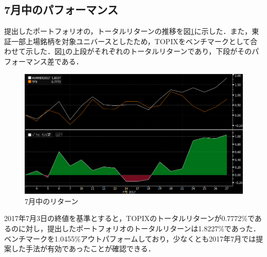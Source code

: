 ﻿\documentclass[a4paper]{jarticle}
\begin{document}
\subsection{7月中のパフォーマンス}

提出したポートフォリオの，トータルリターンの推移を図\ref{fig:totalreturn}に示した．また，東証一部上場銘柄を対象ユニバースとしたため，TOPIXをベンチマークとして合わせて示した．図\ref{fig:totalreturn}の上段がそれぞれのトータルリターンであり，下段がそのパフォーマンス差である．

\begin{figure}[htbp]
	\begin{center}
		\includegraphics[width=15cm]{./fig/totalreturn.png}
		\caption{7月中のリターン}
		\label{fig:totalreturn}
	\end{center}
\end{figure}

2017年7月3日の終値を基準とすると，TOPIXのトータルリターンが0.7772\%であるのに対し，提出したポートフォリオのトータルリターンは1.8227\%であった．
ベンチマークを1.0455\%アウトパフォームしており，少なくとも2017年7月では提案した手法が有効であったことが確認できる．
\end{document}
